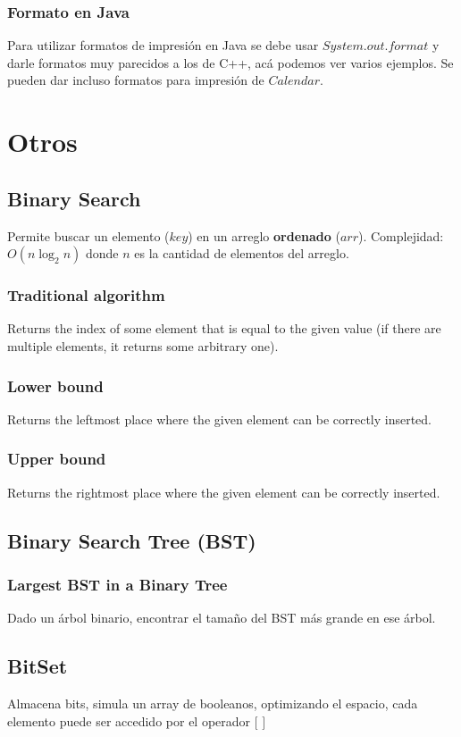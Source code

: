 \documentclass[10pt,letterpaper,twocolumn]{article}
\newcommand{\source}[1]{
	
	\dotfill
}
\begin{document}
		\subsubsection{Formato en Java}
		Para utilizar formatos de impresión en Java se debe usar $System.out.format$ y darle formatos muy parecidos a los de C++, acá podemos ver varios ejemplos. Se pueden dar incluso formatos para impresión de $Calendar$.
		\source{./src/printFormatJava.java}

\section{Otros}
	\subsection{Binary Search}
		Permite buscar un elemento ($key$) en un arreglo \textbf{ordenado} ($arr$).
		Complejidad: $O(n \log_2 n)$ donde $n$ es la cantidad de elementos del arreglo.\\
		\subsubsection{Traditional algorithm}
			Returns the index of some element that is equal to the given value (if there are multiple
			elements, it returns some arbitrary one).
			\source{./src/binary_search.cpp}
		\subsubsection{Lower bound}
			Returns the leftmost place where the given element can be correctly inserted.
			\source{./src/lower_bound.cpp}
		\subsubsection{Upper bound}
			Returns the rightmost place where the given element can be correctly inserted.
			\source{./src/upper_bound.cpp}
	\subsection{Binary Search Tree (BST)}
		\subsubsection{Largest BST in a Binary Tree}
			Dado un árbol binario, encontrar el tamaño del BST más grande en ese árbol.
			\source{./src/largest_bst.java}
	\subsection{BitSet}
		Almacena bits, simula un array de booleanos, optimizando el espacio, cada elemento puede ser accedido por el operador $[$ $]$\\
		\source{./src/bitset.cpp}
\end{document}
